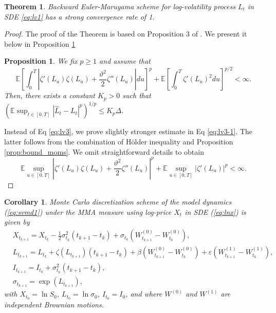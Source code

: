 \documentclass[pdftex,11pt,a4paper] {article}
\newtheorem{corollary}{Corollary}[section]
\newtheorem{theorem}{Theorem}[section]
\newtheorem{proposition}{Proposition}[section]
\begin{document}
\begin{theorem}\label{thm:stron_conv_log_vol2}
Backward Euler-Maruyama scheme for log-volatility process $L_t$ in SDE \eqref{eq:lv1} has a strong convergence rate of 1. 
\end{theorem}


\begin{proof}
The proof of the Theorem is based on Proposition 3 of \cite{Alfonsi2}. We present it below in Proposition \ref{prop:stron_conv_log_vol}  
\begin{proposition}\label{prop:stron_conv_log_vol}
We fix $p\ge 1$ and assume that
\begin{equation}\label{eq:lv3}
\mathbb{E}\left[\int_0^T\left|\zeta'(L_u)\zeta(L_u)+\frac{\vartheta^2}{2}\zeta''(L_u)\right|du\right]^p+
\mathbb{E}\left[\int_0^T\zeta'(L_u)^2du\right]^{p/2}<\infty.
\end{equation}
Then, there exists a constant $K_p>0$ such that $
\left(\mathbb{E}\sup_{t\in [0,T]}\left|\hat L_t-L_t\right|^p\right)^{1/p}\le K_p\Delta
$.
\end{proposition}
Instead of Eq \eqref{eq:lv3}, we prove slightly stronger estimate in Eq \eqref{eq:lv3-1}. The latter follows from the combination of H\"{o}lder inequality and  Proposition \ref{prop:bound_moms}. We omit straightforward details to obtain
\begin{equation}\label{eq:lv3-1}
\mathbb{E}\sup_{u\in [0,T]}\left|\zeta'(L_u)\zeta(L_u)+\frac{\vartheta^2}{2}\zeta''(L_u)\right|^p+
\mathbb{E}\sup_{u\in [0,T]}\left|\zeta'(L_u)\right|^p<\infty.
\end{equation}
\end{proof}



\begin{corollary} Monte Carlo discretization scheme of the model dynamics (\ref{eq:svmd1}) under the MMA measure using log-price $X_{t}$ in SDE (\ref{eq:lnx}) is given by
\begin{equation} \label{eq:msj}
\begin{split}
&X_{t_{k+1}}=X_{t_{k}}-\frac{1}{2}\sigma^{2}_{t_{k}}(t_{k+1}-t_k) +\sigma_{t_{k}} \left(W^{(0)}_{t_{k+1}}-W^{(0)}_{t_k}\right),\\
&  L_{t_{k+1}}= L_{t_k}+\zeta\left( L_{t_{k+1}}\right)(t_{k+1}-t_k)+\beta\left(W^{(0)}_{t_{k+1}}-W^{(0)}_{t_k}\right)+\varepsilon\left(W^{(1)}_{t_{k+1}}-W^{(1)}_{t_k}\right), \\
& I_{t_{k+1}}=I_{t_{k}}+ \sigma^{2}_{t_{k}}(t_{k+1}-t_k), \\
& \sigma_{t_{k+1}} = \exp( L_{t_{k+1}}),
\end{split}
\end{equation}
with $X_{t_{0}} = \ln S_{0}$, $L_{t_{0}}=\ln \sigma_{0}$, $I_{t_{0}}=I_{0}$, and where $W^{(0)}$ and $W^{(1)}$ are independent Brownian motions. 
\end{corollary}
\end{document}
